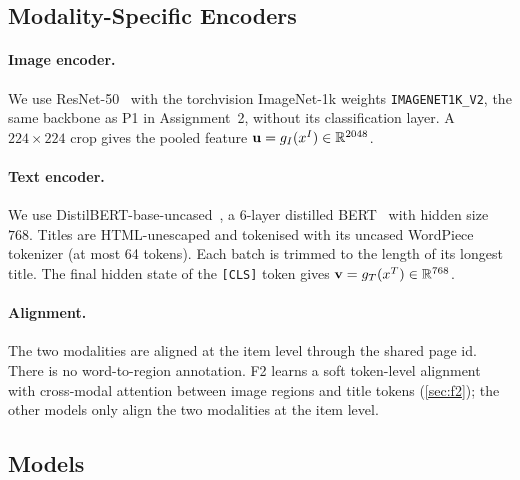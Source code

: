\subsection{Modality-Specific Encoders}
\label{sec:encoders}

\paragraph{Image encoder.}
We use ResNet-50~\cite{he2016resnet} with the torchvision ImageNet-1k weights \texttt{IMAGENET1K\_V2}, the same
backbone as P1 in Assignment~2, without its classification layer. A $224\times224$ crop gives the pooled feature
$\mathbf{u} = g_I(x^{I}) \in \mathbb{R}^{2048}$.

\paragraph{Text encoder.}
We use DistilBERT-base-uncased~\cite{sanh2019distilbert}, a 6-layer distilled BERT~\cite{devlin2019bert} with
hidden size $768$. Titles are HTML-unescaped and tokenised with its uncased WordPiece tokenizer (at most 64
tokens). Each batch is trimmed to the length of its longest title. The final hidden state of the
\texttt{[CLS]} token gives $\mathbf{v} = g_T(x^{T}) \in \mathbb{R}^{768}$.

\paragraph{Alignment.}
The two modalities are aligned at the item level through the shared page id. There is no word-to-region
annotation. F2 learns a soft token-level alignment with cross-modal attention between image regions and title
tokens (\cref{sec:f2}); the other models only align the two modalities at the item level.

\subsection{Models}
\label{sec:models}

